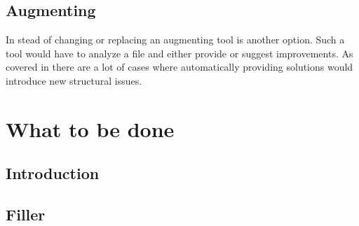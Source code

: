 \subsection{Augmenting {\bibtex}}

In stead of changing or replacing {\bibtex} an augmenting tool is
another option.  Such a tool would have to analyze a {\bibtex} file
and either provide or suggest improvements.  As covered in
 there are a lot of cases where
automatically providing solutions would introduce new structural
issues.





\section{What to be done}
\subsection{Introduction}
\subsection{Filler}
\subsection{}
